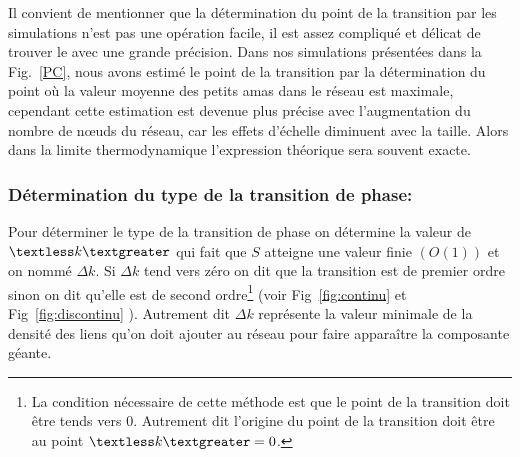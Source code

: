 Il convient de mentionner que la détermination du point de la transition par les simulations n'est pas une opération facile, il est assez compliqué et délicat de trouver le avec une grande précision. Dans nos simulations présentées dans la Fig.~\ref{PC}, nous avons estimé le point de la transition par la détermination du point où la valeur moyenne des petits amas dans le réseau est maximale,  cependant cette estimation est devenue plus précise avec l'augmentation du nombre de nœuds du réseau, car les effets d'échelle diminuent avec la taille. Alors dans la limite thermodynamique l'expression théorique sera souvent exacte. 

\subsubsection{Détermination du type de la transition de phase:}
Pour déterminer le type de la transition de phase on détermine la valeur de $\km$ qui fait que $S$ atteigne une valeur finie $(O(1))$ et on nommé $\Delta k$. Si $\Delta k$ tend vers zéro on dit que la transition est de premier ordre sinon on dit qu'elle est de second ordre\footnote{La condition nécessaire de cette méthode est que le point de la transition doit être tends vers $0$. Autrement dit l'origine du point de la transition doit être au point $\km=0$.} (voir Fig~\ref{fig:continu} et Fig~\ref{fig:discontinu} ). Autrement dit
$\Delta k$ représente la valeur minimale de la densité des liens qu'on doit ajouter au réseau pour faire apparaître la composante géante.  
\\



